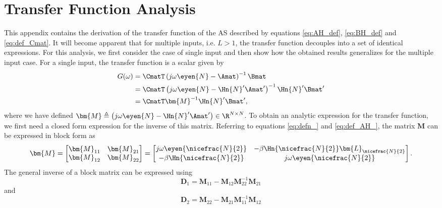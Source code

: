 \chapter{Transfer Function Analysis}
\label{a:tf_analysis}
This appendix contains the derivation of the transfer function of the AS described by equations \ref{eq:AH_def}, \ref{eq:BH_def} and \ref{eq:def_Cmat}. It will become apparent that for multiple inputs, i.e. $L>1$, the transfer function decouples into a set of identical expressions. For this analysis, we first consider the case of single input and then show how the obtained results generalizes for the multiple input case. For a single input, the transfer function is a scalar given by
\begin{align}
    G(\omega) & = \CmatT \left( j\omega \eyen{N} - \Amat \right)^{-1} \Bmat \\
                   & = \CmatT \left( j\omega \eyen{N} - \Hn{N}' \Amat' \right)^{-1} \Hn{N}' \Bmat' \\
                   & = \CmatT \bm{M}^{-1} \Hn{N}' \Bmat',
\end{align}
where we have defined $\bm{M} \triangleq \left( j\omega \eyen{N} - \Hn{N}' \Amat' \right) \in \R^{N \times N}$. To obtain an analytic expression for the transfer function, we first need a closed form expression for the inverse of this matrix. Referring to equations \ref{eq:defn_} and \ref{eq:def_AH_}, the matrix $\bm{M}$ can be expressed in block form as
\begin{equation}
    \bm{M} =
    \begin{bmatrix}
        \bm{M}_{11} & \bm{M}_{21} \\
        \bm{M}_{12} & \bm{M}_{22}
    \end{bmatrix}
    =
    \begin{bmatrix}
        j\omega \eyen{\nicefrac{N}{2}} & -\beta\Hn{\nicefrac{N}{2}}\bm{L}_{\nicefrac{N}{2}} \\
        -\beta \Hn{\nicefrac{N}{2}}    & j\omega\eyen{\nicefrac{N}{2}}
    \end{bmatrix}.
\end{equation}
The general inverse of a block matrix can be expressed using
\begin{equation}
    \label{eq:def_D1}
        \bm{D}_1 = \bm{M}_{11} - \bm{M}_{12}\bm{M}_{22}^{-1}\bm{M}_{21}
\end{equation}
and
\begin{equation}
    \label{eq:def_D2}
        \bm{D}_2 = \bm{M}_{22} - \bm{M}_{21}\bm{M}_{11}^{-1}\bm{M}_{12}
\end{equation}
